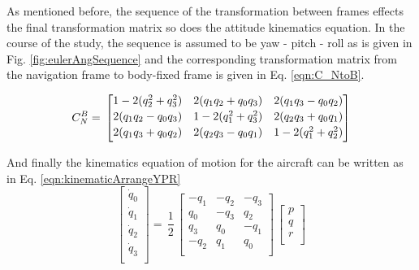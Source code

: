 
As mentioned before, the sequence of the transformation between frames effects the final transformation matrix so does the attitude kinematics equation. In the course of the study, the sequence is assumed to be yaw - pitch - roll as is given in Fig. \ref{fig:eulerAngSequence} and the corresponding transformation matrix from the navigation frame to body-fixed frame is given in Eq. \ref{eqn:C_NtoB}.

\begin{equation}{\label{eqn:C_NtoB}}
C_N^B
= \,
\begin{bmatrix}
1 - 2(q_2^2 + q_3^2) & 2(q_1 q_2 + q_0 q_3) & 2(q_1 q_3 - q_0 q_2)  \\[0.2em]
2(q_1 q_2 - q_0 q_3) & 1 - 2(q_1^2 + q_3^2) & 2(q_2 q_3 + q_0 q_1)\\[0.2em]
2(q_1 q_3 + q_0 q_2) & 2(q_2 q_3 - q_0 q_1) & 1 - 2(q_1^2 + q_2^2) \\[0.2em]
\end{bmatrix}
\end{equation}

And finally the kinematics equation of motion for the aircraft can be written as in Eq. \ref{eqn:kinematicArrangeYPR}
\begin{equation} \label{eqn:kinematicArrangeYPR}
\begin{bmatrix}
\dot{q}_0\\[0.2em]
\dot{q}_1\\[0.2em]
\dot{q}_2\\[0.2em]
\dot{q}_3\\[0.2em]
\end{bmatrix}
 =\,
\frac{1}{2}
\,
\begin{bmatrix}
-q_1 & -q_2 & -q_3 \\
q_0 & -q_3 & q_2 \\
q_3 & q_0 & -q_1 \\
-q_2 & q_1 & q_0\\
\end{bmatrix}
\,
\begin{bmatrix}
p\\[0.2em]
q\\[0.2em]
r\\[0.2em]
\end{bmatrix} 
\end{equation}

